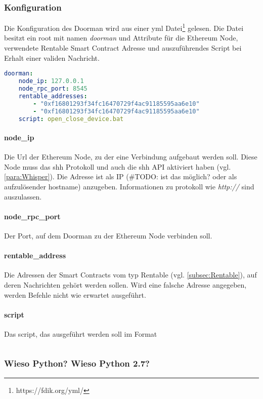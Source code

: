 \subsubsection{Konfiguration}
\label{subsec:Konfiguration}
Die Konfiguration des Doorman wird aus einer yml Datei\footnote{https://fdik.org/yml/} gelesen. Die Datei besitzt ein root mit namen \emph{doorman} und Attribute für die Ethereum Node, verwendete Rentable Smart Contract Adresse und auszuführendes Script bei Erhalt einer validen Nachricht.
\begin{lstlisting}[language=yml,caption={Beispielkonfiguration für Doorman}]
doorman:
    node_ip: 127.0.0.1
    node_rpc_port: 8545
    rentable_addresses:
        - "0xf16801293f34fc16470729f4ac91185595aa6e10"
        - "0xf16801293f34fc16470729f4ac91185595aa6e10"
    script: open_close_device.bat
\end{lstlisting}

\paragraph{node\_ip}
Die Url der Ethereum Node, zu der eine Verbindung aufgebaut werden soll. Diese Node muss das shh Protokoll und auch die shh API aktiviert haben (vgl. \ref{para:Whisper}). Die Adresse ist als IP (\#TODO: ist das möglich? oder als aufzulösender hostname) anzugeben. Informationen zu protokoll wie \emph{http://} sind auszulassen.
\paragraph{node\_rpc\_port}
Der Port, auf dem Doorman zu der Ethereum Node verbinden soll. 
\paragraph{rentable\_address}
Die Adressen der Smart Contracts vom typ Rentable (vgl. \ref{subsec:Rentable}), auf deren Nachrichten gehört werden sollen. Wird eine falsche Adresse angegeben, werden Befehle nicht wie erwartet ausgeführt.
\paragraph{script}
Das script, das ausgeführt werden soll im Format
\begin{lstlisting}[language=yml,caption={Beispielkonfiguration für Doorman}]

\end{lstlisting}

\subsubsection{Wieso Python? Wieso Python 2.7?}

